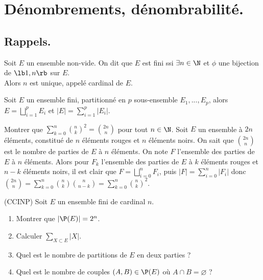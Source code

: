 \documentclass[11pt]{article}
\begin{document}


\vspace*{-0.7cm}

\section{Dénombrements, dénombrabilité.}

\vspace*{-0.4cm}

\subsection{Rappels.}

\begin{defi}{}{}
    Soit $E$ un ensemble non-vide. On dit que $E$ est fini ssi $\exists n \in \N$ et $\phi$ une bijection de $\lb 1, n \rb$ sur $E$.\\
    Alors $n$ est unique, appelé cardinal de $E$.
\end{defi}

\vspace*{-0.8cm}

\begin{prop}{}{}
    Soit $E$ un ensemble fini, partitionné en $p$ sous-ensemble $E_1,...,E_p$, alors $E=\bigsqcup_{i=1}^p E_i$ et $|E|=\sum_{i=1}^p|E_i|$.
\end{prop}

\vspace*{-0.8cm}

\begin{exercice}{}{}
    Montrer que $\sum_{k=0}^n\binom{n}{k}^2 = \binom{2n}{n}$ pour tout $n\in\N$.
    \tcblower
    Soit $E$ un ensemble à $2n$ éléments, constitué de $n$ éléments rouges et $n$ éléments noirs. On sait que $\binom{2n}{n}$ est le nombre de parties de $E$ à $n$ éléments. On note $F$ l'ensemble des parties de $E$ à $n$ éléments. Alors pour $F_k$ l'ensemble des parties de $E$ à $k$ éléments rouges et $n-k$ éléments noirs, il est clair que $F=\bigsqcup_{i=0}^n F_i$, puis $|F|=\sum_{i=0}^n|F_i|$ donc $\binom{2n}{n}=\sum_{k=0}^n\binom{n}{k}\binom{n}{n-k}=\sum_{k=0}^n\binom{n}{k}^2$.
\end{exercice}

\vspace*{-0.8cm}

\begin{exercice}{(CCINP)}{}
    Soit $E$ un ensemble fini de cardinal $n$.
    \begin{enumerate}
        \item Montrer que $|\P(E)|=2^n$.
        \item Calculer $\sum_{X\subset E}|X|$.
        \item Quel est le nombre de partitions de $E$ en deux parties ?
        \item Quel est le nombre de couples $(A,B)\in\P(E)$ où $A\cap B = \varnothing$ ?
    \end{enumerate}
\end{exercice}
\end{document}
